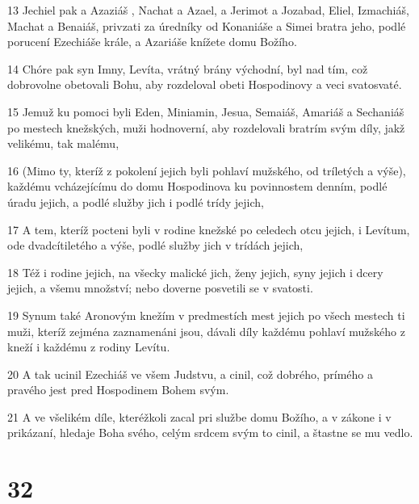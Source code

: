 \par 13 Jechiel pak a Azaziáš , Nachat a Azael, a Jerimot a Jozabad, Eliel, Izmachiáš, Machat a Benaiáš, privzati za úredníky od Konaniáše a Simei bratra jeho, podlé porucení Ezechiáše krále, a Azariáše knížete domu Božího.
\par 14 Chóre pak syn Imny, Levíta, vrátný brány východní, byl nad tím, což dobrovolne obetovali Bohu, aby rozdeloval obeti Hospodinovy a veci svatosvaté.
\par 15 Jemuž ku pomoci byli Eden, Miniamin, Jesua, Semaiáš, Amariáš a Sechaniáš po mestech knežských, muži hodnoverní, aby rozdelovali bratrím svým díly, jakž velikému, tak malému,
\par 16 (Mimo ty, kteríž z pokolení jejich byli pohlaví mužského, od tríletých a výše), každému vcházejícímu do domu Hospodinova ku povinnostem denním, podlé úradu jejich, a podlé služby jich i podlé trídy jejich,
\par 17 A tem, kteríž pocteni byli v rodine knežské po celedech otcu jejich, i Levítum, ode dvadcítiletého a výše, podlé služby jich v trídách jejich,
\par 18 Též i rodine jejich, na všecky malické jich, ženy jejich, syny jejich i dcery jejich, a všemu množství; nebo doverne posvetili se v svatosti.
\par 19 Synum také Aronovým knežím v predmestích mest jejich po všech mestech ti muži, kteríž zejména zaznamenáni jsou, dávali díly každému pohlaví mužského z kneží i každému z rodiny Levítu.
\par 20 A tak ucinil Ezechiáš ve všem Judstvu, a cinil, což dobrého, prímého a pravého jest pred Hospodinem Bohem svým.
\par 21 A ve všelikém díle, kteréžkoli zacal pri službe domu Božího, a v zákone i v prikázaní, hledaje Boha svého, celým srdcem svým to cinil, a štastne se mu vedlo.

\chapter{32}

